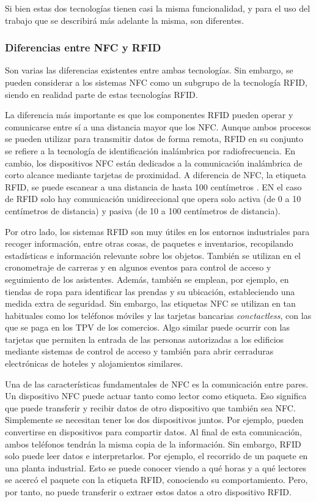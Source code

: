 \documentclass[12pt,a4paper,onecolumn,oneside]{report}
\begin{document}
Si bien estas dos tecnologías tienen casi la misma funcionalidad, y para el uso del trabajo que se describirá más adelante la misma, son diferentes. 


\subsubsection{Diferencias entre NFC y RFID}
\label{Diferencias entre NFC y RFID}

Son varias las diferencias existentes entre ambas tecnologías. Sin embargo, se pueden considerar a los sistemas NFC como un subgrupo de la tecnología RFID, siendo en realidad parte de estas tecnologías RFID.

La diferencia más importante es que los componentes RFID pueden operar y comunicarse entre sí a una distancia mayor que los NFC. Aunque ambos procesos se pueden utilizar para transmitir datos de forma remota, RFID en su conjunto se refiere a la tecnología de identificación inalámbrica por radiofrecuencia. En cambio, los dispositivos NFC están dedicados a la comunicación inalámbrica de corto alcance mediante tarjetas de proximidad. A diferencia de NFC, la etiqueta RFID, se puede escanear a una distancia de hasta 100 centímetros \cite{dos}. EN el caso de RFID solo hay comunicación unidireccional que opera solo activa (de 0 a 10 centímetros de distancia) y pasiva (de 10 a 100 centímetros de distancia).

Por otro lado, los sistemas RFID son muy útiles en los entornos industriales para recoger información, entre otras cosas, de paquetes e inventarios, recopilando estadísticas e información relevante sobre los objetos. También se utilizan en el cronometraje de carreras y en algunos eventos para control de acceso y seguimiento de los asistentes. Además, también se emplean, por ejemplo, en tiendas de ropa para identificar las prendas y su ubicación, estableciendo una medida extra de seguridad. Sin embargo, las etiquetas NFC se utilizan en tan habituales como los teléfonos móviles y las tarjetas bancarias \textit{conctactless}, con las que se paga en los TPV de los comercios. Algo similar puede ocurrir con las tarjetas que permiten la entrada de las personas autorizadas a los edificios mediante sistemas de control de acceso y también para abrir cerraduras electrónicas de hoteles y alojamientos similares.

Una de las características fundamentales de NFC es la comunicación entre pares. Un dispositivo NFC puede actuar tanto como lector como etiqueta. Eso significa que puede transferir y recibir datos de otro dispositivo que también sea NFC. Simplemente se necesitan tener los dos dispositivos juntos. Por ejemplo, pueden convertirse en dispositivos para compartir datos. Al final de esta comunicación, ambos teléfonos tendrán la misma copia de la información. Sin embargo, RFID solo puede leer datos e interpretarlos. Por ejemplo, el recorrido de un paquete en una planta industrial. Esto se puede conocer viendo a qué horas y a qué lectores se acercó el paquete con la etiqueta RFID, conociendo su comportamiento. Pero, por tanto, no puede transferir o extraer estos datos a otro dispositivo RFID.
\end{document}
